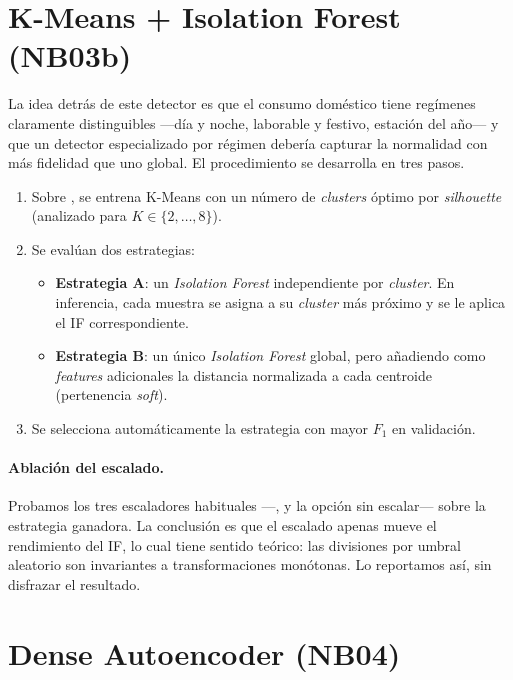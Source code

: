 \section{K-Means + Isolation Forest (NB03b)}
\label{sec:nb03b}

La idea detrás de este detector es que el consumo doméstico tiene regímenes claramente distinguibles ---día y noche, laborable y festivo, estación del año--- y que un detector especializado por régimen debería capturar la normalidad con más fidelidad que uno global. El procedimiento se desarrolla en tres pasos.

\begin{enumerate}[label=\textbf{\arabic*.},leftmargin=*,topsep=0pt]
  \item Sobre , se entrena K-Means con un número de \textit{clusters} óptimo por \emph{silhouette} (analizado para $K \in \{2, \ldots, 8\}$).
  \item Se evalúan dos estrategias:
    \begin{itemize}[leftmargin=*]
      \item \textbf{Estrategia A}: un \textit{Isolation Forest} independiente por \textit{cluster}. En inferencia, cada muestra se asigna a su \textit{cluster} más próximo y se le aplica el IF correspondiente.
      \item \textbf{Estrategia B}: un único \textit{Isolation Forest} global, pero añadiendo como \textit{features} adicionales la distancia normalizada a cada centroide (pertenencia \textit{soft}).
    \end{itemize}
  \item Se selecciona automáticamente la estrategia con mayor $F_1$ en validación.
\end{enumerate}

\paragraph{Ablación del escalado.} Probamos los tres escaladores habituales ---,  y la opción sin escalar--- sobre la estrategia ganadora. La conclusión es que el escalado apenas mueve el rendimiento del IF, lo cual tiene sentido teórico: las divisiones por umbral aleatorio son invariantes a transformaciones monótonas. Lo reportamos así, sin disfrazar el resultado.

\section{Dense Autoencoder (NB04)}
\label{sec:nb04}

